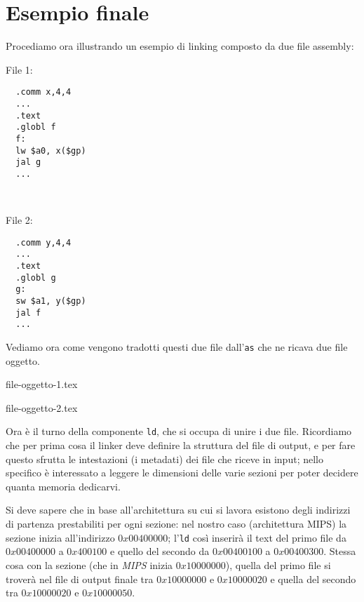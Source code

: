 \documentclass[class=book, crop=false, oneside]{standalone}
\begin{document}
\section{Esempio finale}
Procediamo ora illustrando un esempio di linking composto da due file assembly:
\begin{center}
\begin{minipage}{0.3\textwidth}
\begin{center}File 1:\end{center}
\begin{verbatim}
  .comm x,4,4
  ...
  .text
  .globl f
  f:
  lw $a0, x($gp)
  jal g
  ...
\end{verbatim}
\end{minipage}%
\begin{minipage}{0.2\textwidth}
~
\end{minipage}%
\begin{minipage}{0.3\textwidth}
\begin{center}File 2:\end{center}
\begin{verbatim}
  .comm y,4,4
  ...
  .text
  .globl g
  g:
  sw $a1, y($gp)
  jal f
  ...
\end{verbatim}
\end{minipage}
\end{center}
Vediamo ora come vengono tradotti questi due file dall'\texttt{as} che ne ricava due file oggetto.
\begin{table}[H]
	{file-oggetto-1.tex}
	\caption{File oggetto 1}
\end{table}
\begin{table}[H]
	{file-oggetto-2.tex}
	\caption{File oggetto 2}
\end{table}
Ora è il turno della componente \texttt{ld}, che si occupa di unire i due file. Ricordiamo che per prima cosa il linker deve definire la struttura del file di output, e per fare questo sfrutta le intestazioni (i metadati) dei file che riceve in input; nello specifico è interessato a leggere le dimensioni delle varie sezioni per poter decidere quanta memoria dedicarvi.

Si deve sapere che in base all'architettura su cui si lavora esistono degli indirizzi di partenza prestabiliti per ogni sezione: nel nostro caso (architettura MIPS) la sezione  inizia all'indirizzo \(0x00400000\); l'\texttt{ld} così inserirà il text del primo file da \(0x00400000\) a \(0x400100\) e quello del secondo da \(0x00400100\) a \(0x00400300\).
Stessa cosa con la sezione  (che in \emph{MIPS} inizia \(0x10000000\)), quella del primo file si troverà nel file di output finale tra \(0x10000000\) e \(0x10000020\) e quella del secondo tra \(0x10000020\) e \(0x10000050\).
\end{document}

